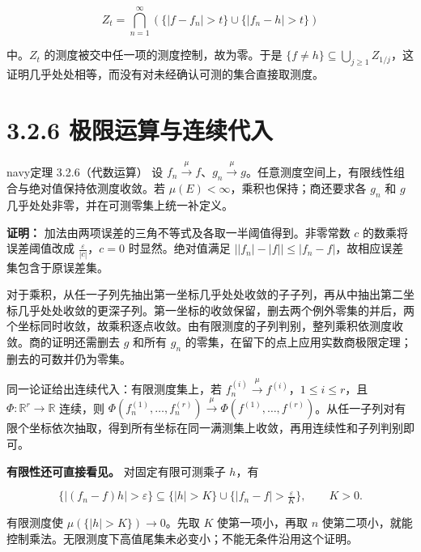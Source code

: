 \documentclass[11pt,a4paper]{article}
\begin{document}
\begin{equation*}
Z_t=\bigcap_{n=1}^{\infty}
\left(\{|f-f_n|>t\}\cup\{|f_n-h|>t\}\right)
\end{equation*}

中。\(Z_t\) 的测度被交中任一项的测度控制，故为零。于是
\(\{f\ne h\}\subseteq\bigcup_{j\ge1}Z_{1/j}\)，这证明几乎处处相等，而没有对未经确认可测的集合直接取测度。

\section[\S{}3.2.6
极限运算与连续代入]{3.2.6
极限运算与连续代入}\label{ux6781ux9650ux8fd0ux7b97ux4e0eux8fdeux7eedux4ee3ux5165}

\begin{sboxenv}{navy}{定理 3.2.6（代数运算）}
设
\(f_n\xrightarrow{\mu}f\)、\(g_n\xrightarrow{\mu}g\)。任意测度空间上，有限线性组合与绝对值保持依测度收敛。若
\(\mu(E)<\infty\)，乘积也保持；商还要求各 \(g_n\) 和 \(g\)
几乎处处非零，并在可测零集上统一补定义。

\end{sboxenv}

\textbf{证明：} 加法由两项误差的三角不等式及各取一半阈值得到。非零常数
\(c\) 的数乘将误差阈值改成 \(\frac\varepsilon{|c|}\)，\(c=0\)
时显然。绝对值满足
\(\bigl||f_n|-|f|\bigr|\le|f_n-f|\)，故相应误差集包含于原误差集。

对于乘积，从任一子列先抽出第一坐标几乎处处收敛的子子列，再从中抽出第二坐标几乎处处收敛的更深子列。第一坐标的收敛保留，删去两个例外零集的并后，两个坐标同时收敛，故乘积逐点收敛。由有限测度的子列判别，整列乘积依测度收敛。商的证明还需删去
\(g\) 和所有 \(g_n\)
的零集，在留下的点上应用实数商极限定理；删去的可数并仍为零集。

同一论证给出连续代入：有限测度集上，若
\(f_n^{(i)}\xrightarrow{\mu}f^{(i)}\)，\(1\le i\le r\)，且
\(\Phi:\mathbb R^r\to\mathbb R\) 连续，则
\(\Phi(f_n^{(1)},\ldots,f_n^{(r)})\xrightarrow{\mu}\Phi(f^{(1)},\ldots,f^{(r)})\)。从任一子列对有限个坐标依次抽取，得到所有坐标在同一满测集上收敛，再用连续性和子列判别即可。

\textbf{有限性还可直接看见。} 对固定有限可测乘子 \(h\)，有

\begin{equation*}
\{|(f_n-f)h|>\varepsilon\}
\subseteq\{|h|>K\}\cup\{|f_n-f|>\tfrac\varepsilon K\},\qquad K>0.
\tag{3.2.9}
\end{equation*}

有限测度使 \(\mu(\{|h|>K\})\to0\)。先取 \(K\) 使第一项小，再取 \(n\)
使第二项小，就能控制乘法。无限测度下高值尾集未必变小；不能无条件沿用这个证明。
\end{document}
